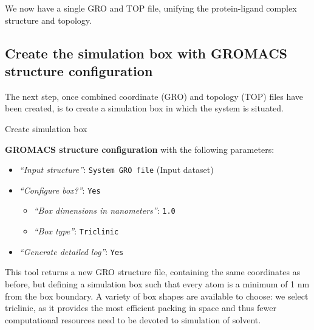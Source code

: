 \documentclass[twocolumn]{bmcart}%
\providecommand{\tightlist}{%
  \setlength{\itemsep}{0pt}\setlength{\parskip}{0pt}}
\begin{document}
We now have a single GRO and TOP file, unifying the protein-ligand complex structure and topology.

\subsection*{\texorpdfstring{Create the simulation box with
\textbf{GROMACS structure
configuration}}{Create the simulation box with GROMACS structure configuration}}\label{create-the-simulation-box-with-gromacs-structure-configuration}

The next step, once combined coordinate (GRO) and topology (TOP) files
have been created, is to create a simulation box in which the system is
situated.

\begin{handson_box_colour}{Create simulation box}


  \textbf{GROMACS structure configuration} with the following
  parameters:

  \begin{itemize}
  \item
    \emph{``Input structure''}: \texttt{System\ GRO\ file} (Input
    dataset)
  \item
    \emph{``Configure box?''}: \texttt{Yes}

    \begin{itemize}
    \item
      \emph{``Box dimensions in nanometers''}: \texttt{1.0}
    \item
      \emph{``Box type''}: \texttt{Triclinic}
    \end{itemize}
  \item
    \emph{``Generate detailed log''}: \texttt{Yes}
  \end{itemize}

\end{handson_box_colour}

This tool returns a new GRO structure file, containing the same coordinates as before, but defining a simulation box such that every atom is a minimum of 1 nm from the box boundary. A variety of box shapes are available to choose: we select triclinic, as it provides the most efficient packing in space and thus fewer computational resources need to be devoted to simulation of solvent. 
\end{document}
